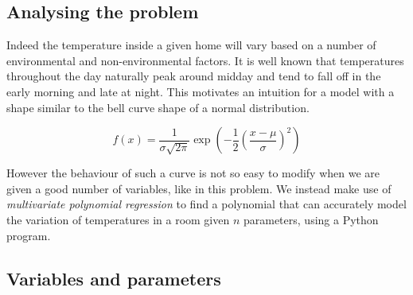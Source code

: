 \documentclass[11pt]{article}
\begin{document}
\subsection{Analysing the problem}

Indeed the temperature inside a given home will vary based on a number of environmental and non-environmental
factors. It is well known that temperatures throughout the day naturally peak around midday and tend to fall off in
the early morning and late at night. This motivates an intuition for a model with a shape similar to the bell curve
shape of a normal distribution.

\[
f(x) = \frac{1}{\sigma \sqrt{2\pi}} \exp \left( -\frac{1}{2} \left( \frac{x-\mu}{\sigma} \right)^2 \right)
\]

\noindent
However the behaviour of such a curve is not so easy to modify when we are given a good number of variables, like in
this problem. We instead make use of \textit{multivariate polynomial regression} to find a polynomial that can
accurately model the variation of temperatures in a room given $n$ parameters, using a Python program.

\subsection{Variables and parameters}
\end{document}
